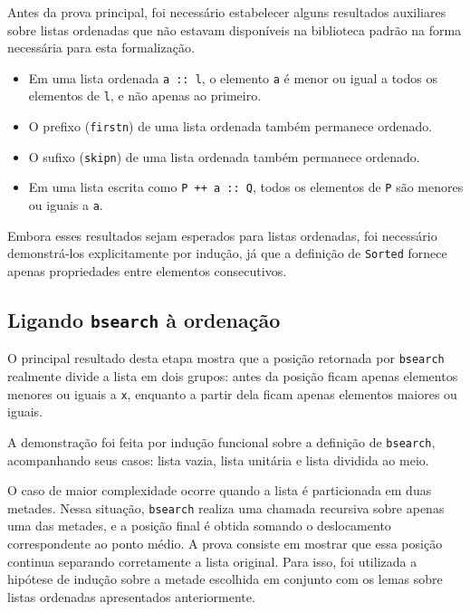 \documentclass{article}
\begin{document}
Antes da prova principal, foi necessário estabelecer alguns resultados
auxiliares sobre listas ordenadas que não estavam disponíveis na biblioteca
padrão na forma necessária para esta formalização.

\begin{itemize}
  \item Em uma lista ordenada \texttt{a :: l}, o elemento \texttt{a} é
        menor ou igual a todos os elementos de \texttt{l}, e não apenas ao
        primeiro.

  \item O prefixo (\texttt{firstn}) de uma lista ordenada também permanece
        ordenado.

  \item O sufixo (\texttt{skipn}) de uma lista ordenada também permanece
        ordenado.

  \item Em uma lista escrita como \texttt{P ++ a :: Q}, todos os elementos
        de \texttt{P} são menores ou iguais a \texttt{a}.
\end{itemize}

Embora esses resultados sejam esperados para listas ordenadas, foi
necessário demonstrá-los explicitamente por indução, já que a definição de
\texttt{Sorted} fornece apenas propriedades entre elementos consecutivos.

\subsection{Ligando \texttt{bsearch} à ordenação}

O principal resultado desta etapa mostra que a posição retornada por
\texttt{bsearch} realmente divide a lista em dois grupos: antes da posição
ficam apenas elementos menores ou iguais a \texttt{x}, enquanto a partir
dela ficam apenas elementos maiores ou iguais.

A demonstração foi feita por indução funcional sobre a definição de
\texttt{bsearch}, acompanhando seus casos: lista vazia, lista unitária e
lista dividida ao meio.

O caso de maior complexidade ocorre quando a lista é particionada em duas
metades. Nessa situação, \texttt{bsearch} realiza uma chamada recursiva
sobre apenas uma das metades, e a posição final é obtida somando o
deslocamento correspondente ao ponto médio. A prova consiste em mostrar que
essa posição continua separando corretamente a lista original. Para isso,
foi utilizada a hipótese de indução sobre a metade escolhida em conjunto
com os lemas sobre listas ordenadas apresentados anteriormente.
\end{document}
